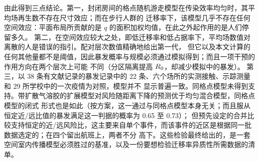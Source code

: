 由此得到三点结论。第一，封闭房间的格点随机游走模型在传染效率均匀时，其平均场再生数不存在尺寸效应；而在步行人群的
迁移率下，该模型几乎不存在任何空间效应：平面布局所贡献的是 $q$ 的面积加权均值，在此之外起作用的是人们停留多久。
第二，在空间效应较大之处，即低迁移率和低占据率下，平均场数值对离散的人是错误的指引。配对层次数值精确地给出第一代，
但它以及本文计算的任何其他量都不是阈值，因此暴发概率与规模必须通过模拟得到；而且一项干预的作用方向在两个层次上可能
不同（分区隔离提高 $R_0$，却减少模拟中的暴发）。
第三，以 38 条有文献记录的暴发记录中的 22 条、六个场所的实测接触、示踪测量和 29 所学校中的一次疫情为对照，模型并不
显示普遍一致。同格点模型未得到支持。带扩散气溶胶的扩展模型对风险随距离下降的预测优于均匀混合模型，同格点模型的闭式
形式也是如此（按方案，这一通过与同格点模型本身无关；而且服从恒定近/远比值的暴发满足这一判据的概率为 0.65 至 0.73）；
但预先设定的合并比较支持恒定的近/远风险比，这主要来自单个事件，而该事件的近区是根据同一批数据选定的；在四个留出航班上，两者不分
高下。这些检验最终给出的，是一套空间室内传播模型必须胜过的基准，以及一份要想检验迁移率异质性所需数据的清单。
